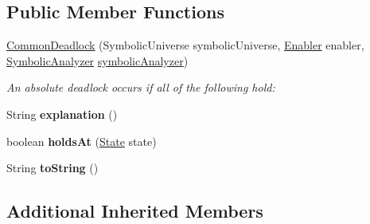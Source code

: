 \subsection*{Public Member Functions}
\begin{DoxyCompactItemize}
\item 
\hyperlink{classedu_1_1udel_1_1cis_1_1vsl_1_1civl_1_1predicate_1_1common_1_1CommonDeadlock_aea1d02b97b5f1a57870173b68593be50}{Common\+Deadlock} (Symbolic\+Universe symbolic\+Universe, \hyperlink{interfaceedu_1_1udel_1_1cis_1_1vsl_1_1civl_1_1kripke_1_1IF_1_1Enabler}{Enabler} enabler, \hyperlink{interfaceedu_1_1udel_1_1cis_1_1vsl_1_1civl_1_1semantics_1_1IF_1_1SymbolicAnalyzer}{Symbolic\+Analyzer} \hyperlink{classedu_1_1udel_1_1cis_1_1vsl_1_1civl_1_1predicate_1_1common_1_1CommonCIVLStatePredicate_aae6b467bb269d59726bab69c91b5ccef}{symbolic\+Analyzer})
\begin{DoxyCompactList}\small\item\em An absolute deadlock occurs if all of the following hold\+: \end{DoxyCompactList}\item 
\hypertarget{classedu_1_1udel_1_1cis_1_1vsl_1_1civl_1_1predicate_1_1common_1_1CommonDeadlock_a7c3b636d4a77087411fe8a434a08ce02}{}String {\bfseries explanation} ()\label{classedu_1_1udel_1_1cis_1_1vsl_1_1civl_1_1predicate_1_1common_1_1CommonDeadlock_a7c3b636d4a77087411fe8a434a08ce02}

\item 
\hypertarget{classedu_1_1udel_1_1cis_1_1vsl_1_1civl_1_1predicate_1_1common_1_1CommonDeadlock_a22cd5973bc5d7b95dab9c5c6bd23fc5d}{}boolean {\bfseries holds\+At} (\hyperlink{interfaceedu_1_1udel_1_1cis_1_1vsl_1_1civl_1_1state_1_1IF_1_1State}{State} state)\label{classedu_1_1udel_1_1cis_1_1vsl_1_1civl_1_1predicate_1_1common_1_1CommonDeadlock_a22cd5973bc5d7b95dab9c5c6bd23fc5d}

\item 
\hypertarget{classedu_1_1udel_1_1cis_1_1vsl_1_1civl_1_1predicate_1_1common_1_1CommonDeadlock_a174024505ed081f2a84b664f5e76084c}{}String {\bfseries to\+String} ()\label{classedu_1_1udel_1_1cis_1_1vsl_1_1civl_1_1predicate_1_1common_1_1CommonDeadlock_a174024505ed081f2a84b664f5e76084c}

\end{DoxyCompactItemize}
\subsection*{Additional Inherited Members}



